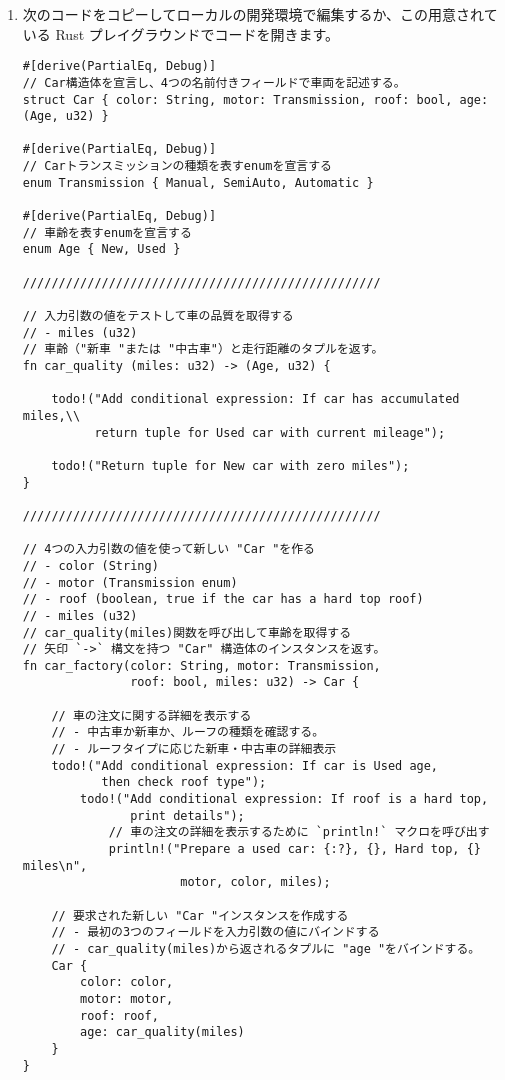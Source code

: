 \begin{enumerate}

\item 次のコードをコピーしてローカルの開発環境で編集するか、この用意されている Rust プレイグラウンドでコードを開きます。


\begin{lstlisting}[numbers=none]
#[derive(PartialEq, Debug)]
// Car構造体を宣言し、4つの名前付きフィールドで車両を記述する。
struct Car { color: String, motor: Transmission, roof: bool, age: (Age, u32) }

#[derive(PartialEq, Debug)]
// Carトランスミッションの種類を表すenumを宣言する
enum Transmission { Manual, SemiAuto, Automatic }

#[derive(PartialEq, Debug)]
// 車齢を表すenumを宣言する
enum Age { New, Used }

//////////////////////////////////////////////////

// 入力引数の値をテストして車の品質を取得する
// - miles (u32)
// 車齢（"新車 "または "中古車"）と走行距離のタプルを返す。
fn car_quality (miles: u32) -> (Age, u32) {

    todo!("Add conditional expression: If car has accumulated miles,\\
          return tuple for Used car with current mileage");

    todo!("Return tuple for New car with zero miles");
}

//////////////////////////////////////////////////

// 4つの入力引数の値を使って新しい "Car "を作る
// - color (String)
// - motor (Transmission enum)
// - roof (boolean, true if the car has a hard top roof)
// - miles (u32)
// car_quality(miles)関数を呼び出して車齢を取得する
// 矢印 `->` 構文を持つ "Car" 構造体のインスタンスを返す。
fn car_factory(color: String, motor: Transmission,
               roof: bool, miles: u32) -> Car {

    // 車の注文に関する詳細を表示する
    // - 中古車か新車か、ルーフの種類を確認する。
    // - ルーフタイプに応じた新車・中古車の詳細表示
    todo!("Add conditional expression: If car is Used age,
           then check roof type");
        todo!("Add conditional expression: If roof is a hard top,
               print details");
            // 車の注文の詳細を表示するために `println!` マクロを呼び出す
            println!("Prepare a used car: {:?}, {}, Hard top, {} miles\n",
                      motor, color, miles);  

    // 要求された新しい "Car "インスタンスを作成する
    // - 最初の3つのフィールドを入力引数の値にバインドする
    // - car_quality(miles)から返されるタプルに "age "をバインドする。
    Car {
        color: color,
        motor: motor,
        roof: roof,
        age: car_quality(miles)
    }
}


\end{lstlisting}
\end{enumerate}
